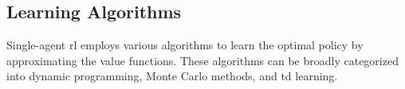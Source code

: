 \subsection*{Learning Algorithms}
Single-agent \gls{rl} employs various algorithms to learn the optimal policy by approximating 
the value functions. These algorithms can be broadly categorized into dynamic programming, 
Monte Carlo methods, and \gls{td} learning.






\clearpage
\begin{comment}



2.2 Single-Agent Reinforcement Learning --

3. Evolution to Multi-Agent Systems

3.1 Cooperative and Competitive Multi-Agent Systems

Multi-agent reinforcement learning (MARL) introduces scenarios where multiple agents interact, either cooperatively or competitively. These interactions add layers of complexity, as agents must consider not only their actions but also the actions of other agents.

	•	Key Paper: Littman, M.L. (1994). Markov games as a framework for multi-agent reinforcement learning.

3.2 Advances in MARL

The advancement of MARL includes the development of algorithms that allow agents to learn in environments with other learning agents, leading to applications in fields such as robotics, game theory, and economics.

	•	Key Paper: Busoniu, L., Babuska, R., & De Schutter, B. (2008). A comprehensive survey of multi-agent reinforcement learning.
	•	Key Paper: Mnih, V. et al. (2015). Human-level control through deep reinforcement learning.
	•	Key Paper: Silver, D. et al. (2017). Mastering the game of Go without human knowledge.

4. Introduction to Heterogeneous-Agent Reinforcement Learning (HARL)

4.1 Definition and Significance

HARL extends MARL by allowing agents with different capabilities and knowledge to interact. This heterogeneity mirrors real-world scenarios more closely, where agents (e.g., robots, drones) often have diverse functionalities.

	•	Key Paper: Lowe, R. et al. (2017). Multi-Agent Actor-Critic for Mixed Cooperative-Competitive Environments.


\end{comment}
